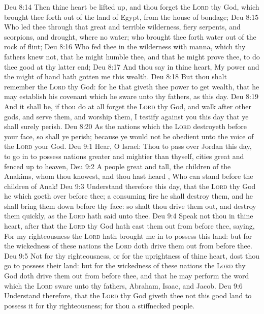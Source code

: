 \vs Deu 8:14 Then thine heart be lifted up, and thou forget the \textsc{Lord} thy God, which brought thee forth out of the land of Egypt, from the house of bondage;
\vs Deu 8:15 Who led thee through that great and terrible wilderness,  fiery serpents, and scorpions, and drought, where  no water; who brought thee forth water out of the rock of flint;
\vs Deu 8:16 Who fed thee in the wilderness with manna, which thy fathers knew not, that he might humble thee, and that he might prove thee, to do thee good at thy latter end;
\vs Deu 8:17 And thou say in thine heart, My power and the might of  hand hath gotten me this wealth.
\vs Deu 8:18 But thou shalt remember the \textsc{Lord} thy God: for  he that giveth thee power to get wealth, that he may establish his covenant which he sware unto thy fathers, as  this day.
\vs Deu 8:19 And it shall be, if thou do at all forget the \textsc{Lord} thy God, and walk after other gods, and serve them, and worship them, I testify against you this day that ye shall surely perish.
\vs Deu 8:20 As the nations which the \textsc{Lord} destroyeth before your face, so shall ye perish; because ye would not be obedient unto the voice of the \textsc{Lord} your God.
\vs Deu 9:1 Hear, O Israel: Thou  to pass over Jordan this day, to go in to possess nations greater and mightier than thyself, cities great and fenced up to heaven,
\vs Deu 9:2 A people great and tall, the children of the Anakims, whom thou knowest, and  thou hast heard , Who can stand before the children of Anak!
\vs Deu 9:3 Understand therefore this day, that the \textsc{Lord} thy God  he which goeth over before thee;  a consuming fire he shall destroy them, and he shall bring them down before thy face: so shalt thou drive them out, and destroy them quickly, as the \textsc{Lord} hath said unto thee.
\vs Deu 9:4 Speak not thou in thine heart, after that the \textsc{Lord} thy God hath cast them out from before thee, saying, For my righteousness the \textsc{Lord} hath brought me in to possess this land: but for the wickedness of these nations the \textsc{Lord} doth drive them out from before thee.
\vs Deu 9:5 Not for thy righteousness, or for the uprightness of thine heart, dost thou go to possess their land: but for the wickedness of these nations the \textsc{Lord} thy God doth drive them out from before thee, and that he may perform the word which the \textsc{Lord} sware unto thy fathers, Abraham, Isaac, and Jacob.
\vs Deu 9:6 Understand therefore, that the \textsc{Lord} thy God giveth thee not this good land to possess it for thy righteousness; for thou  a stiffnecked people.
